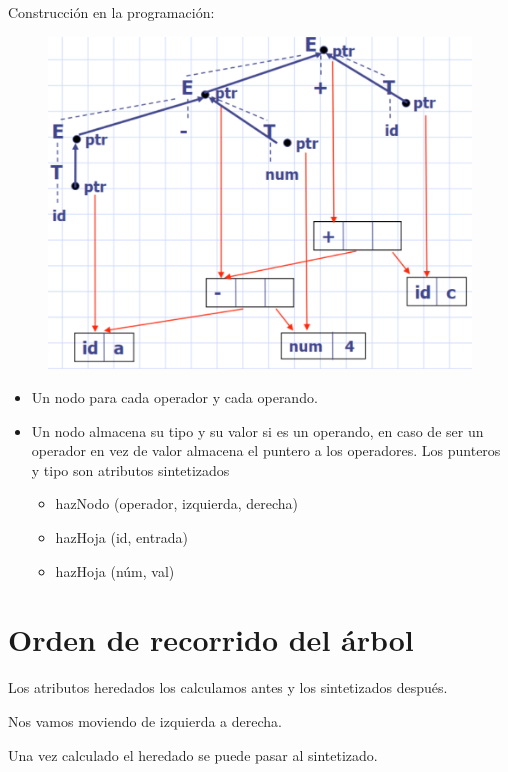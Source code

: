 \documentclass[12pt, twoside, openright]{report} %
\begin{document}
Construcción en la programación:
\begin{figure}[H]
  {\includegraphics[scale=.25]{2021-05-01 01_30_29-05_resum_Sem_2021.pdf - Foxit Reader.png}}
\end{figure}
\begin{itemize}
  \item Un nodo para cada operador y cada operando.
  \item Un nodo almacena su tipo y su valor si es un operando, en caso de ser un operador en vez de valor almacena el puntero a los operadores. Los punteros y tipo son atributos sintetizados
  \begin{itemize}
    \item hazNodo (operador, izquierda, derecha)
    \item hazHoja (id, entrada)
    \item hazHoja (núm, val)
  \end{itemize}
\end{itemize}

\section{Orden de recorrido del árbol}

Los atributos heredados los calculamos antes y los sintetizados después. 

Nos vamos moviendo de izquierda a derecha.

Una vez calculado el heredado se puede pasar al sintetizado.
\end{document}
